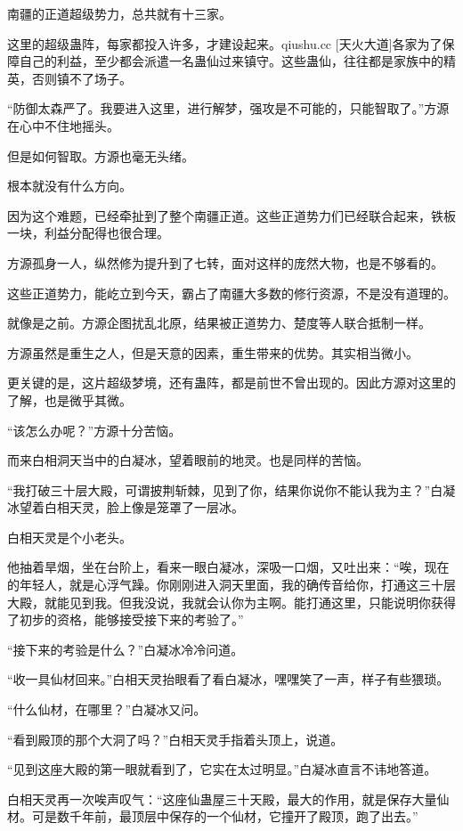 \begin{this_body}
南疆的正道超级势力，总共就有十三家。

这里的超级蛊阵，每家都投入许多，才建设起来。qiushu.cc [天火大道]各家为了保障自己的利益，至少都会派遣一名蛊仙过来镇守。这些蛊仙，往往都是家族中的精英，否则镇不了场子。

“防御太森严了。我要进入这里，进行解梦，强攻是不可能的，只能智取了。”方源在心中不住地摇头。

但是如何智取。方源也毫无头绪。

根本就没有什么方向。

因为这个难题，已经牵扯到了整个南疆正道。这些正道势力们已经联合起来，铁板一块，利益分配得也很合理。

方源孤身一人，纵然修为提升到了七转，面对这样的庞然大物，也是不够看的。

这些正道势力，能屹立到今天，霸占了南疆大多数的修行资源，不是没有道理的。

就像是之前。方源企图扰乱北原，结果被正道势力、楚度等人联合抵制一样。

方源虽然是重生之人，但是天意的因素，重生带来的优势。其实相当微小。

更关键的是，这片超级梦境，还有蛊阵，都是前世不曾出现的。因此方源对这里的了解，也是微乎其微。

“该怎么办呢？”方源十分苦恼。

而来白相洞天当中的白凝冰，望着眼前的地灵。也是同样的苦恼。

“我打破三十层大殿，可谓披荆斩棘，见到了你，结果你说你不能认我为主？”白凝冰望着白相天灵，脸上像是笼罩了一层冰。

白相天灵是个小老头。

他抽着旱烟，坐在台阶上，看来一眼白凝冰，深吸一口烟，又吐出来：“唉，现在的年轻人，就是心浮气躁。你刚刚进入洞天里面，我的确传音给你，打通这三十层大殿，就能见到我。但我没说，我就会认你为主啊。能打通这里，只能说明你获得了初步的资格，能够接受接下来的考验了。”

“接下来的考验是什么？”白凝冰冷冷问道。

“收一具仙材回来。”白相天灵抬眼看了看白凝冰，嘿嘿笑了一声，样子有些猥琐。

“什么仙材，在哪里？”白凝冰又问。

“看到殿顶的那个大洞了吗？”白相天灵手指着头顶上，说道。

“见到这座大殿的第一眼就看到了，它实在太过明显。”白凝冰直言不讳地答道。

白相天灵再一次唉声叹气：“这座仙蛊屋三十天殿，最大的作用，就是保存大量仙材。可是数千年前，最顶层中保存的一个仙材，它撞开了殿顶，跑了出去。”


\end{this_body}
